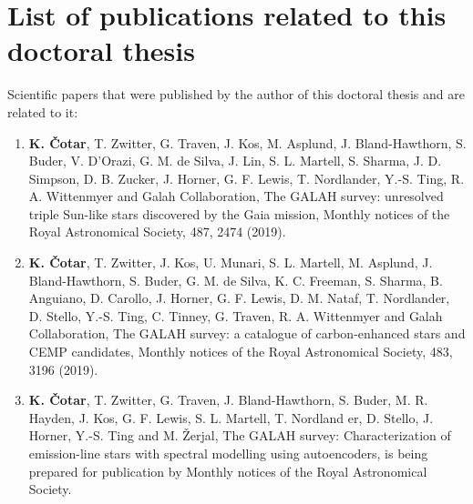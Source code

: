 

\cleardoublepage{}
{}
\chapter*{List of publications related to this doctoral thesis}

Scientific papers that were published by the author of this doctoral thesis and are related to it:
\begin{enumerate}
	\item{\textbf{K. Čotar}, T. Zwitter, G. Traven, J. Kos, M. Asplund, J. Bland-Hawthorn, S. Buder, V. D’Orazi, G. M. de Silva, J. Lin, S. L. Martell, S. Sharma, J. D. Simpson, D. B. Zucker, J. Horner, G. F. Lewis, T. Nordlander, Y.-S. Ting, R. A. Wittenmyer and Galah Collaboration, The GALAH survey: unresolved triple Sun-like stars discovered by the Gaia mission, Monthly notices of the Royal Astronomical Society, 487, 2474 (2019).}
	\item{\textbf{K. Čotar}, T. Zwitter, J. Kos, U. Munari, S. L. Martell, M. Asplund, J. Bland-Hawthorn, S. Buder, G. M. de Silva, K. C. Freeman, S. Sharma, B. Anguiano, D. Carollo, J. Horner, G. F. Lewis, D. M. Nataf, T. Nordlander, D. Stello, Y.-S. Ting, C. Tinney, G. Traven, R. A. Wittenmyer and Galah Collaboration, The	GALAH survey: a catalogue of carbon-enhanced stars and CEMP candidates, Monthly notices of the Royal Astronomical Society, 483, 3196 (2019).}
	\item{\textbf{K. Čotar}, T. Zwitter, G. Traven, J. Bland-Hawthorn, S. Buder, M. R. Hayden, J. Kos, G. F. Lewis, S. L. Martell, T. Nordland er, D. Stello, J. Horner, Y.-S. Ting and M. Žerjal, The GALAH survey: Characterization of emission-line stars with spectral modelling using autoencoders, is being prepared for publication by Monthly notices of the Royal Astronomical Society.}
\end{enumerate}

